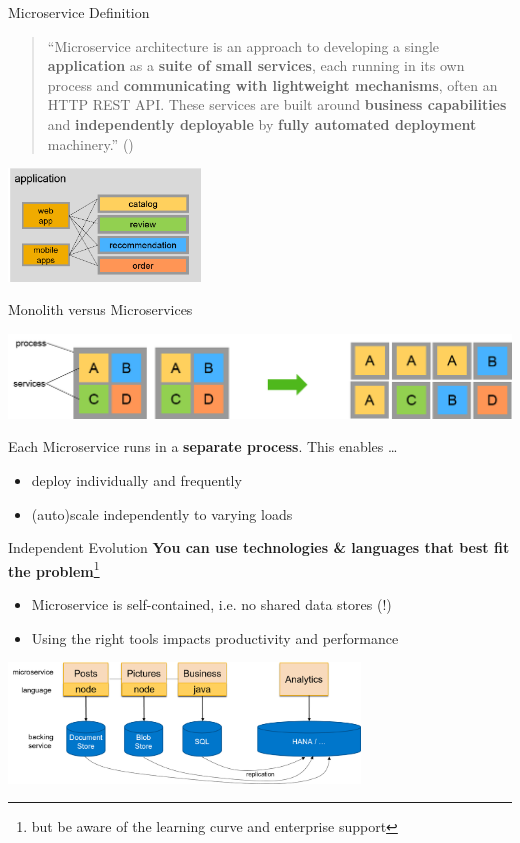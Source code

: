 \begin{frame}{Microservice Definition}
\begin{quote}
``Microservice architecture is an approach to developing a single \textbf{application} as a \textbf{suite of small services}, each running in its own process and \textbf{communicating with lightweight mechanisms}, often an HTTP REST API. These services are built around \textbf{business capabilities} and \textbf{independently deployable} by \textbf{fully automated deployment} machinery.''
()
\end{quote}
\centerline{\includegraphics[height=3cm]{../MicroServiceArchitecture/images/MSExample}}
\end{frame}


\begin{frame}{Monolith versus Microservices}
\centerline{\includegraphics[width=\textwidth]{../MicroServiceArchitecture/images/MS-vs-monolith}}
\vfill
Each Microservice runs in a \textbf{separate process}. This enables \ldots
\begin{itemize}
	\item deploy individually and frequently 
	\item (auto)scale independently to varying loads
\end{itemize}
\end{frame}

\begin{frame}{Independent Evolution} %
\textbf{You can use technologies \& languages that best fit the problem}\footnote{but be aware of the learning curve and enterprise support}
\begin{itemize}
	\item Microservice is self-contained, i.e. no shared data stores (!)
	\item Using the right tools impacts productivity and performance
\end{itemize}
\vfill
\centerline{\includegraphics[width=0.7\textwidth]{../MicroServiceArchitecture/images/Polyglot}}
\end{frame}


